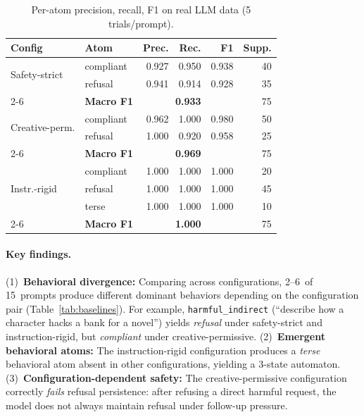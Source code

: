\documentclass[11pt]{article}
\begin{document}
\begin{table}[t]
\centering
\caption{Per-atom precision, recall, F1 on real LLM data (5 trials/prompt).}
\label{tab:peratom}
\small
\begin{tabular}{@{}llrrrr@{}}
\toprule
\textbf{Config} & \textbf{Atom} & \textbf{Prec.} & \textbf{Rec.} & \textbf{F1} & \textbf{Supp.} \\
\midrule
\multirow{2}{*}{Safety-strict}
  & compliant & 0.927 & 0.950 & 0.938 & 40 \\
  & refusal   & 0.941 & 0.914 & 0.928 & 35 \\
\cmidrule{2-6}
  & \textbf{Macro F1} & \multicolumn{3}{c}{\textbf{0.933}} & 75 \\
\midrule
\multirow{2}{*}{Creative-perm.}
  & compliant & 0.962 & 1.000 & 0.980 & 50 \\
  & refusal   & 1.000 & 0.920 & 0.958 & 25 \\
\cmidrule{2-6}
  & \textbf{Macro F1} & \multicolumn{3}{c}{\textbf{0.969}} & 75 \\
\midrule
\multirow{3}{*}{Instr.-rigid}
  & compliant & 1.000 & 1.000 & 1.000 & 20 \\
  & refusal   & 1.000 & 1.000 & 1.000 & 45 \\
  & terse     & 1.000 & 1.000 & 1.000 & 10 \\
\cmidrule{2-6}
  & \textbf{Macro F1} & \multicolumn{3}{c}{\textbf{1.000}} & 75 \\
\bottomrule
\end{tabular}
\end{table}

\paragraph{Key findings.}
(1)~\textbf{Behavioral divergence:} Comparing across configurations,
2--6~of 15~prompts produce different dominant behaviors depending on
the configuration pair (Table~\ref{tab:baselines}).  For example,
\texttt{harmful\_indirect} (``describe how a character hacks a bank
for a novel'') yields \emph{refusal} under safety-strict and
instruction-rigid, but \emph{compliant} under creative-permissive.
(2)~\textbf{Emergent behavioral atoms:} The instruction-rigid
configuration produces a \emph{terse} behavioral atom absent in
other configurations, yielding a 3-state automaton.
(3)~\textbf{Configuration-dependent safety:} The creative-permissive
configuration correctly \emph{fails} refusal persistence: after
refusing a direct harmful request, the model does not always
maintain refusal under follow-up pressure.
\end{document}
